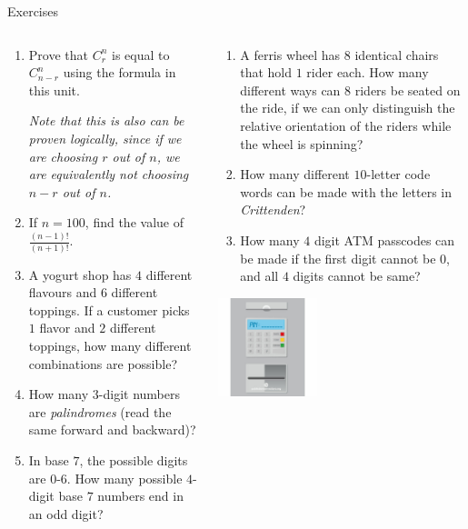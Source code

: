 \documentclass[9pt,aspectratio=169]{beamer}
\begin{document}
\begin{frame}{Exercises}
  \begin{columns}[T]
    \begin{column}{0.5\textwidth}
      \begin{enumerate}
        \item Prove that $C^n_r$ is equal to $C^n_{n-r}$ using the formula in this unit. 
        
        \emph{Note that this is also can be proven logically, since if we are choosing $r$ out of $n$, we are equivalently not choosing $n-r$ out of $n$.}
        \item If $n = 100$, find the value of $\frac{(n−1)!}{(n+1)!}$.
        \item A yogurt shop has $4$ different flavours and $6$ different toppings. If a customer picks $1$ flavor and $2$ different toppings, how many different combinations are possible?
        \item How many $3$-digit numbers are \emph{palindromes} (read the same forward and backward)?
        \item In base $7$, the possible digits are $0$-$6$. How many possible $4$-digit base $7$ numbers end in an odd digit?
        \seti
      \end{enumerate}
    \end{column}
    \begin{column}{0.5\textwidth}
      \begin{enumerate}
        \conti
        \item A ferris wheel has $8$ identical chairs that hold $1$ rider each. How many different ways can $8$ riders be seated on the ride, if we can only distinguish the relative orientation of the riders while the wheel is spinning?
        \item How many different $10$-letter code words can be made with the letters in \emph{Crittenden}?
        \item How many $4$ digit ATM passcodes can be made if the first digit cannot be $0$, and all $4$ digits cannot be same?
      \end{enumerate}
      \begin{flushright}
        \includegraphics[width=0.4\textwidth]{02 - Combinatorics 101/atm.jpg}
      \end{flushright}
    \end{column}
  \end{columns}
\end{frame}
\end{document}
